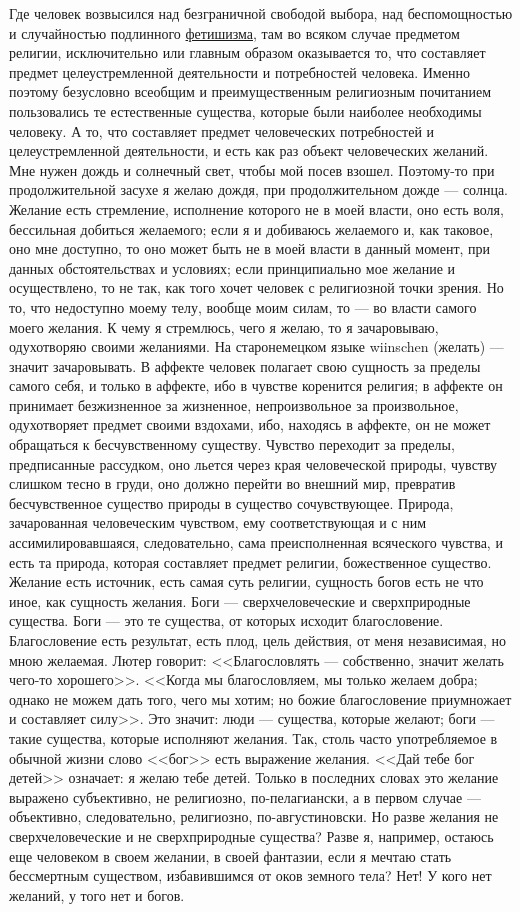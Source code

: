 \documentclass[12pt]{article}
\begin{document}
Где человек возвысился над безграничной свободой выбора, над беспомощностью и случайностью подлинного \underline{фетишизма}, там во всяком случае предметом религии, исключительно или главным образом оказывается то, что составляет предмет целеустремленной деятельности и потребностей человека. Именно поэтому безусловно всеобщим и преимущественным религиозным почитанием пользовались те естественные существа, которые были наиболее необходимы человеку. А то, что составляет предмет человеческих потребностей и целеустремленной деятельности, и есть как раз объект человеческих желаний. Мне нужен дождь и солнечный свет, чтобы мой посев взошел. Поэтому-то при продолжительной засухе я желаю дождя, при продолжительном дожде --- солнца. Желание есть стремление, исполнение которого не в моей власти, оно есть воля, бессильная добиться желаемого; если я и добиваюсь желаемого и, как таковое, оно мне доступно, то оно может быть не в моей власти в данный момент, при данных обстоятельствах и условиях; если принципиально мое желание и осуществлено, то не так, как того хочет человек с религиозной точки зрения. Но то, что недоступно моему телу, вообще моим силам, то --- во власти самого моего желания. К чему я стремлюсь, чего я желаю, то я зачаровываю, одухотворяю своими желаниями. На старонемецком языке wiinschen (желать) --- значит зачаровывать. В аффекте человек полагает свою сущность за пределы самого себя, и только в аффекте, ибо в чувстве коренится религия; в аффекте он принимает безжизненное за жизненное, непроизвольное за произвольное, одухотворяет предмет своими вздохами, ибо, находясь в аффекте, он не может обращаться к бесчувственному существу. Чувство переходит за пределы, предписанные рассудком, оно льется через края человеческой природы, чувству слишком тесно в груди, оно должно перейти во внешний мир, превратив бесчувственное существо природы в существо сочувствующее. Природа, зачарованная человеческим чувством, ему соответствующая и с ним ассимилировавшаяся, следовательно, сама преисполненная всяческого чувства, и есть та природа, которая составляет предмет религии, божественное существо. Желание есть источник, есть самая суть религии, сущность богов есть не что иное, как сущность желания. Боги --- сверхчеловеческие и сверхприродные существа. Боги --- это те существа, от которых исходит благословение. Благословение есть результат, есть плод, цель действия, от меня независимая, но мною желаемая. Лютер говорит: <<Благословлять --- собственно, значит желать чего-то хорошего>>. <<Когда мы благословляем, мы только желаем добра; однако не можем дать того, чего мы хотим; но божие благословение приумножает и составляет силу>>. Это значит: люди --- существа, которые желают; боги --- такие существа, которые исполняют желания. Так, столь часто употребляемое в обычной жизни слово <<бог>> есть выражение желания. <<Дай тебе бог детей>> означает: я желаю тебе детей. Только в последних словах это желание выражено субъективно, не религиозно, по-пелагиански, а в первом случае --- объективно, следовательно, религиозно, по-августиновски. Но разве желания не сверхчеловеческие и не сверхприродные существа? Разве я, например, остаюсь еще человеком в своем желании, в своей фантазии, если я мечтаю стать бессмертным существом, избавившимся от оков земного тела? Нет! У кого нет желаний, у того нет и богов. 
\end{document}
